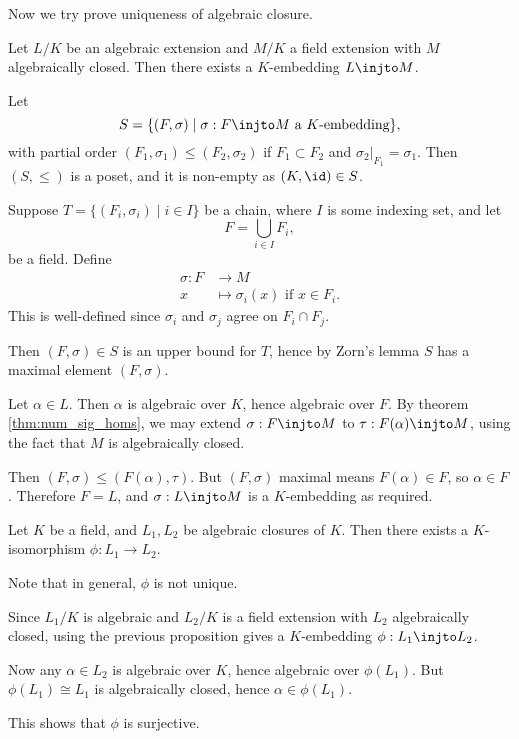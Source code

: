\documentclass[12pt]{article}
\begin{document}

Now we try prove uniqueness of algebraic closure.

\begin{proposition}
	Let $L/K$ be an algebraic extension and $M/K$ a field extension with $M$ algebraically closed. Then there exists a $K$-embedding $L \injto M$.
\end{proposition}

\begin{proofbox}
	Let
		\[
			S = \{(F, \sigma) \mid \sigma : F \injto M \text{ a $K$-embedding}\},
		\]
	with partial order $(F_1, \sigma_1) \leq (F_2, \sigma_2)$ if $F_1 \subset F_2$ and $\sigma_2|_{F_1} = \sigma_1$. Then $(S, \leq)$ is a poset, and it is non-empty as $(K, \id) \in S$.

	Suppose $T = \{(F_i, \sigma_i) \mid i \in I\}$ be a chain, where $I$ is some indexing set, and let
	\[
	F = \bigcup_{i \in I} F_i,
	\]
	be a field. Define
	\begin{align*}
		\sigma : F &\to M \\
		x &\mapsto \sigma_i(x) \text{ if } x \in F_i.
	\end{align*}
	This is well-defined since $\sigma_i$ and $\sigma_j$ agree on $F_i \cap F_j$.

	Then $(F, \sigma) \in S$ is an upper bound for $T$, hence by Zorn's lemma $S$ has a maximal element $(F, \sigma)$.

	Let $\alpha \in L$. Then $\alpha$ is algebraic over $K$, hence algebraic over $F$. By theorem \ref{thm:num_sig_homs}, we may extend $\sigma : F \injto M$ to $\tau : F(\alpha) \injto M$, using the fact that $M$ is algebraically closed.

	Then $(F, \sigma) \leq (F(\alpha), \tau)$. But $(F, \sigma)$ maximal means $F(\alpha) \in F$, so $\alpha \in F$. Therefore $F = L$, and $\sigma : L \injto M$ is a $K$-embedding as required.
\end{proofbox}

\begin{corollary}
	Let $K$ be a field, and $L_1, L_2$ be algebraic closures of $K$. Then there exists a $K$-isomorphism $\phi : L_1 \to L_2$.
\end{corollary}

Note that in general, $\phi$ is not unique.

\begin{proofbox}
	Since $L_1/K$ is algebraic and $L_2/K$ is a field extension with $L_2$ algebraically closed, using the previous proposition gives a $K$-embedding $\phi : L_1 \injto L_2$.

	Now any $\alpha \in L_2$ is algebraic over $K$, hence algebraic over $\phi(L_1)$. But $\phi(L_1) \cong L_1$ is algebraically closed, hence $\alpha \in \phi(L_1)$.

	This shows that $\phi$ is surjective.
\end{proofbox}
\end{document}

